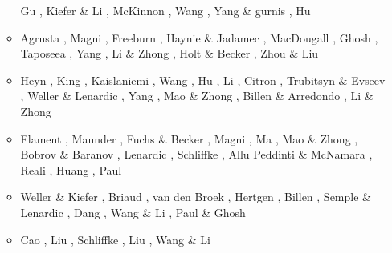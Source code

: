 \begin{itemize}
\begin{scriptsize}
\begin{itemize}
                    Gu \etal \cite{gulm16}, Kiefer \& Li \cite{kili16},
                    McKinnon \etal \cite{mcnw16}, Wang \etal \cite{wahz16},
                    Yang \& gurnis \cite{yagu16}, Hu \etal \cite{hulh16}
\item[\twothousandseventeen] Agrusta \etal \cite{aggv17}, Magni \etal \cite{maav17},
                       Freeburn \etal \cite{frbm17}, Haynie \& Jadamec \cite{haja17},
                       MacDougall \etal \cite{majf17}, Ghosh \etal \cite{ghts17},
                       Taposeea \etal \cite{taac17}, Yang \etal \cite{yagz17},
                       Li \& Zhong \cite{lizh17}, Holt \& Becker \cite{hobe17},
                       Zhou \& Liu \cite{zhli17}
\item[\twothousandeighteen] Heyn \etal \cite{hect18}, King \cite{king18},
                    Kaislaniemi \etal \cite{kavb18}, Wang \etal \cite{wavp18},
                    Hu \etal \cite{hulz18}, Li \etal \cite{lizo18},
                    Citron \etal \cite{cimt18}, Trubitsyn \& Evseev \cite{trev18},
                    Weller \& Lenardic \cite{wele18}, Yang \etal \cite{yagz18},
                    Mao \& Zhong \cite{mazh18}, Billen \& Arredondo \cite{biar18},
                    Li \& Zhong \cite{lizh19}
\item[\twothousandnineteen] Flament \cite{flam19}, Maunder \etal \cite{mavb19},
                    Fuchs \& Becker \cite{fube19}, Magni \cite{magn19}, 
                    Ma \etal \cite{malg19}, Mao \& Zhong \cite{mazh19},
                    Bobrov \& Baranov \cite{boba19}, Lenardic \etal \cite{lewh19},
                    Schliffke \etal \cite{scvm19}, Allu Peddinti \& McNamara \cite{almc19},
                    Reali \etal \cite{rejv19}, Huang \etal \cite{huzl19},
                    Paul \etal \cite{pagc19}
\item[\twothousandtwenty] Weller \& Kiefer \cite{weki20}, Briaud \etal \cite{braf20}, 
                    van den Broek \etal \cite{vamg20}, Hertgen \etal \cite{heyg20}, 
                    Billen \cite{bill20}, Semple \& Lenardic \cite{sele20},
                    Dang \etal \cite{dazl20}, Wang \& Li \cite{wali20}, Paul \& Ghosh \cite{pagh20}
\item[\twothousandtwentyone] Cao \etal \cite{cafm21}, Liu \etal \cite{ligl21},
                             Schliffke \etal \cite{scvg21}, Liu \etal \cite{ligl21b},
                             Wang \& Li \cite{wali21}
\end{itemize}
\end{scriptsize}



\end{itemize}
